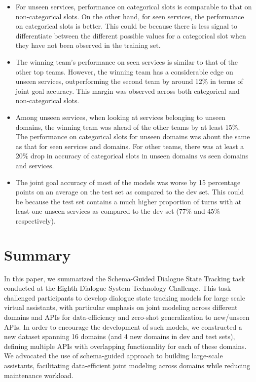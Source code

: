 \begin{itemize}
    \item For unseen services, performance on categorical slots is comparable to that on non-categorical slots. On the other hand, for seen services, the performance on categorical slots is better. This could be because there is less signal to differentiate between the different possible values for a categorical slot when they have not been observed in the training set.
    
    \item The winning team's performance on seen services is similar to that of the other top teams. However, the winning team has a considerable edge on unseen services, outperforming the second team by around 12\% in terms of joint goal accuracy. This margin was observed across both categorical and non-categorical slots.
    
    \item Among unseen services, when looking at services belonging to unseen domains, the winning team was ahead of the other teams by at least 15\%. The performance on categorical slots for unseen domains was about the same as that for seen services and domains. For other teams, there was at least a 20\% drop in accuracy of categorical slots in unseen domains vs seen domains and services.
    
    \item The joint goal accuracy of most of the models was worse by 15 percentage points on an average on the test set as compared to the dev set. This could be because the test set contains a much higher proportion of turns with at least one unseen services as compared to the dev set (77\% and 45\% respectively).
\end{itemize}

\section{Summary}
In this paper, we summarized the Schema-Guided Dialogue State Tracking task conducted at the Eighth Dialogue System Technology Challenge. This task challenged participants to develop dialogue state tracking models for large scale virtual assistants, with particular emphasis on joint modeling across different domains and APIs for data-efficiency and zero-shot generalization to new/unseen APIs. In order to encourage the development of such models, we constructed a new dataset spanning 16 domains (and 4 new domains in dev and test sets), defining multiple APIs with overlapping functionality for each of these domains. We advocated the use of schema-guided approach to building large-scale assistants, facilitating data-efficient joint modeling across domains while reducing maintenance workload.

